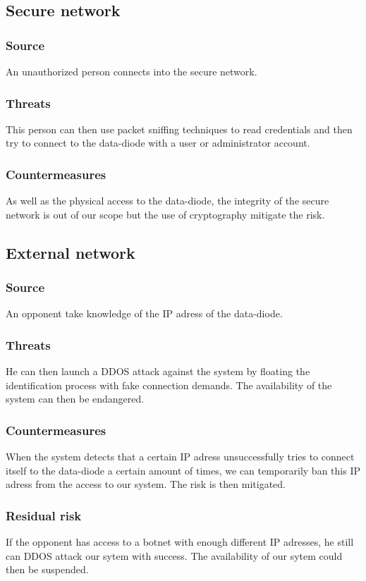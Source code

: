 \documentclass[a4paper,11pt]{article}
\begin{document}
\subsection{Secure network}
\subsubsection{Source}
An unauthorized person connects into the secure network.
\subsubsection{Threats}
This person can then use packet sniffing techniques to read credentials and then try to connect to the data-diode with a user or administrator account.
\subsubsection{Countermeasures}
As well as the physical access to the data-diode, the integrity of the secure network is out of our scope but the use of cryptography mitigate the risk.
\subsection{External network}
\subsubsection{Source}
An opponent take knowledge of the IP adress of the data-diode.
\subsubsection{Threats}
He can then launch a DDOS attack against the system by floating the identification process with fake connection demands. The availability of the system can then be endangered.
\subsubsection{Countermeasures}
When the system detects that a certain IP adress unsuccessfully tries to connect itself to the data-diode a certain amount of times, we can temporarily ban this IP adress from the access to our system.  The risk is then mitigated.
\subsubsection{Residual risk}
If the opponent has access to a botnet with enough different IP adresses, he still can DDOS attack our sytem with success. The availability of our sytem could then be suspended.
\end{document}
